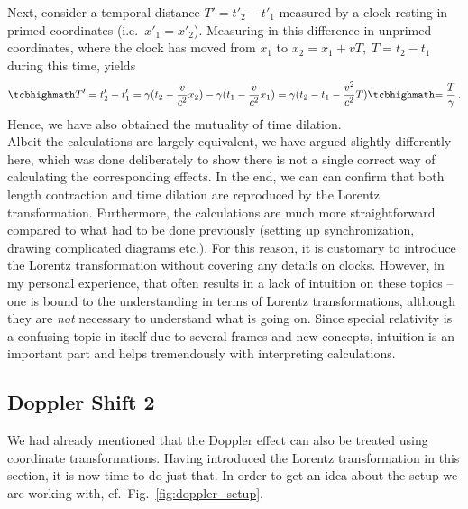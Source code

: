\documentclass[../relativity_main.tex]{subfiles}
\begin{document}
Next, consider a temporal distance $T' = t'_2 - t'_1$ measured by a clock resting in primed coordinates (i.e.~$x'_1 = x'_2$). Measuring in this difference in unprimed coordinates, where the clock has moved from $x_1$ to $x_2 = x_1 + v T, \; T = t_2 - t_1$ during this time, yields
\begin{equation}
	\eqbox{T'} = t'_2 - t'_1 = \gamma (t_2 - \frac{v}{c^2} x_2) - \gamma (t_1 - \frac{v}{c^2} x_1) = \gamma (t_2 - t_1 - \frac{v^2}{c^2} T) \eqbox{= \frac{T}{\gamma}} \, .
\end{equation}
Hence, we have also obtained the mutuality of time dilation.\\


Albeit the calculations are largely equivalent, we have argued slightly differently here, which was done deliberately to show there is not a single correct way of calculating the corresponding effects. In the end, we can can confirm that both length contraction and time dilation are reproduced by the Lorentz transformation. Furthermore, the calculations are much more straightforward compared to what had to be done previously (setting up synchronization, drawing complicated diagrams etc.). For this reason, it is customary to introduce the Lorentz transformation without covering any details on clocks. However, in my personal experience, that often results in a lack of intuition on these topics -- one is bound to the understanding in terms of Lorentz transformations, although they are \emph{not} necessary to understand what is going on. Since special relativity is a confusing topic in itself due to several frames and new concepts, intuition is an important part and helps tremendously with interpreting calculations.



		\subsection{Doppler Shift 2}
We had already mentioned that the Doppler effect can also be treated using coordinate transformations. Having introduced the Lorentz transformation in this section, it is now time to do just that. In order to get an idea about the setup we are working with, cf.~Fig.~\ref{fig:doppler_setup}.
\end{document}
